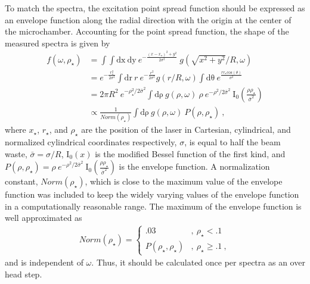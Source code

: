 To match the spectra, the excitation point spread function should be expressed as an envelope function along the radial direction with the origin at the center of the microchamber.
Accounting for the point spread function, the shape of the measured spectra is given by
\begin{align*}
	f(\omega,\rho_{\star})&=
		\int \int \mathrm{dx} \ \mathrm{dy} \ e^{-\frac{(x-x_{\star})^2+y^2}{2 \sigma^2}} \ g(\sqrt{x^2+y^2}/R,\omega) \\
	&=e^{-\frac{r_{\star}^2}{2 \sigma^2}} \int  \mathrm{dr} \ r \ e^{-\frac{r^2}{2 \sigma^2}} g(r/R,\omega) 
		\int \mathrm{d \theta} \ e^{\frac{r r_{\star} \mathrm{cos}(\theta)}{\sigma^2}} \\
	&=2\pi R^2 \ e^{-\rho_{\star}^2/2 \bar{\sigma}^2} \int \mathrm{d \rho} \ g(\rho,\omega) \
		\rho \ e^{-\rho^2/2 \bar{\sigma}^2} \
		\mathrm{I}_{0} \left( \frac{\rho \rho_{\star}}{\bar{\sigma}^2} \right) \\
	&\propto \frac{1}{Norm(\rho_{\star})} \int \mathrm{d \rho} \ g(\rho,\omega) \ P(\rho,\rho_{\star}) \ ,
\end{align*}
where $x_{\star}$, $r_{\star}$, and $\rho_{\star}$ are the position of the laser in Cartesian, cylindrical, and normalized cylindrical coordinates respectively, $\sigma$, is equal to half the beam waste, $\bar{\sigma}=\sigma/R$, $\mathrm{I}_0(x)$ is the modified Bessel function of the first kind, and $P(\rho,\rho_{\star})=\rho \ e^{-\rho^2/2 \bar{\sigma}^2} \ \mathrm{I}_0 \left( \frac{\rho \rho_{\star}}{\bar{\sigma}^2} \right)$ is the envelope function.
A normalization constant, $Norm(\rho_{\star})$, which is close to the maximum value of the envelope function was included to keep the widely varying values of the envelope function in a computationally reasonable range.
The maximum of the envelope function is well approximated as
\begin{align*}
	Norm(\rho_{\star})=
		\begin{cases}
			.03 							& , \ \rho_{\star} <    .1 \\
			P(\rho_{\star}, \rho_{\star})	& , \ \rho_{\star} \geq .1 \ ,
		\end{cases}
\end{align*}
and is independent of $\omega$.
Thus, it should be calculated once per spectra as an over head step.

